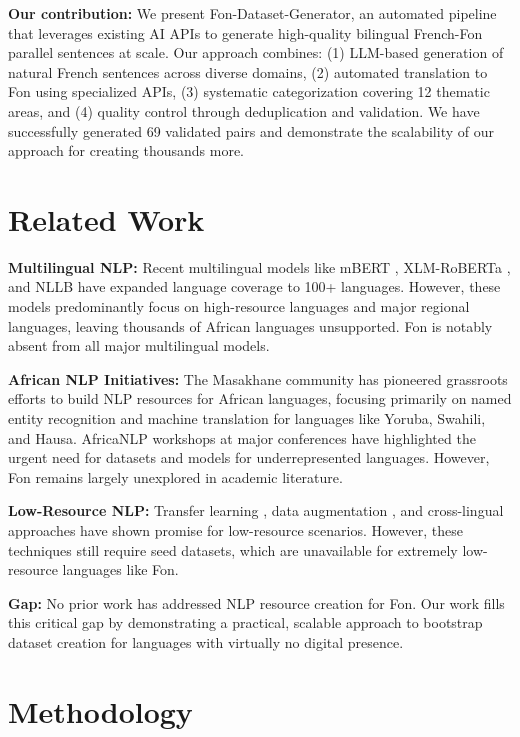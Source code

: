 \documentclass[10pt,twocolumn]{article}
\begin{document}
\textbf{Our contribution:} We present Fon-Dataset-Generator, an automated pipeline that leverages existing AI APIs to generate high-quality bilingual French-Fon parallel sentences at scale. Our approach combines: (1) LLM-based generation of natural French sentences across diverse domains, (2) automated translation to Fon using specialized APIs, (3) systematic categorization covering 12 thematic areas, and (4) quality control through deduplication and validation. We have successfully generated 69 validated pairs and demonstrate the scalability of our approach for creating thousands more.

\section{Related Work}

\textbf{Multilingual NLP:} Recent multilingual models like mBERT \cite{devlin2019bert}, XLM-RoBERTa \cite{conneau2020unsupervised}, and NLLB \cite{nllb2022} have expanded language coverage to 100+ languages. However, these models predominantly focus on high-resource languages and major regional languages, leaving thousands of African languages unsupported. Fon is notably absent from all major multilingual models.

\textbf{African NLP Initiatives:} The Masakhane community \cite{orife2020masakhane} has pioneered grassroots efforts to build NLP resources for African languages, focusing primarily on named entity recognition and machine translation for languages like Yoruba, Swahili, and Hausa. AfricaNLP workshops at major conferences have highlighted the urgent need for datasets and models for underrepresented languages. However, Fon remains largely unexplored in academic literature.

\textbf{Low-Resource NLP:} Transfer learning \cite{ruder2019transfer}, data augmentation \cite{feng2021survey}, and cross-lingual approaches have shown promise for low-resource scenarios. However, these techniques still require seed datasets, which are unavailable for extremely low-resource languages like Fon.

\textbf{Gap:} No prior work has addressed NLP resource creation for Fon. Our work fills this critical gap by demonstrating a practical, scalable approach to bootstrap dataset creation for languages with virtually no digital presence.

\section{Methodology}
\end{document}
